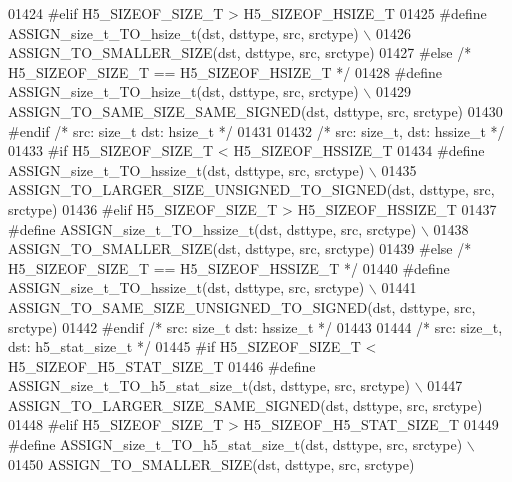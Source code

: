 \begin{DoxyCode}
01424 \textcolor{preprocessor}{#elif H5\_SIZEOF\_SIZE\_T > H5\_SIZEOF\_HSIZE\_T}
01425 \textcolor{preprocessor}{    #define ASSIGN\_size\_t\_TO\_hsize\_t(dst, dsttype, src, srctype) \(\backslash\)}
01426 \textcolor{preprocessor}{        ASSIGN\_TO\_SMALLER\_SIZE(dst, dsttype, src, srctype)}
01427 \textcolor{preprocessor}{#else }\textcolor{comment}{/* H5\_SIZEOF\_SIZE\_T == H5\_SIZEOF\_HSIZE\_T */}\textcolor{preprocessor}{}
01428 \textcolor{preprocessor}{    #define ASSIGN\_size\_t\_TO\_hsize\_t(dst, dsttype, src, srctype) \(\backslash\)}
01429 \textcolor{preprocessor}{        ASSIGN\_TO\_SAME\_SIZE\_SAME\_SIGNED(dst, dsttype, src, srctype)}
01430 \textcolor{preprocessor}{#endif }\textcolor{comment}{/* src: size\_t dst: hsize\_t */}\textcolor{preprocessor}{}
01431 
01432 \textcolor{comment}{/* src: size\_t, dst: hssize\_t */}
01433 \textcolor{preprocessor}{#if H5\_SIZEOF\_SIZE\_T < H5\_SIZEOF\_HSSIZE\_T}
01434 \textcolor{preprocessor}{    #define ASSIGN\_size\_t\_TO\_hssize\_t(dst, dsttype, src, srctype) \(\backslash\)}
01435 \textcolor{preprocessor}{        ASSIGN\_TO\_LARGER\_SIZE\_UNSIGNED\_TO\_SIGNED(dst, dsttype, src, srctype)}
01436 \textcolor{preprocessor}{#elif H5\_SIZEOF\_SIZE\_T > H5\_SIZEOF\_HSSIZE\_T}
01437 \textcolor{preprocessor}{    #define ASSIGN\_size\_t\_TO\_hssize\_t(dst, dsttype, src, srctype) \(\backslash\)}
01438 \textcolor{preprocessor}{        ASSIGN\_TO\_SMALLER\_SIZE(dst, dsttype, src, srctype)}
01439 \textcolor{preprocessor}{#else }\textcolor{comment}{/* H5\_SIZEOF\_SIZE\_T == H5\_SIZEOF\_HSSIZE\_T */}\textcolor{preprocessor}{}
01440 \textcolor{preprocessor}{    #define ASSIGN\_size\_t\_TO\_hssize\_t(dst, dsttype, src, srctype) \(\backslash\)}
01441 \textcolor{preprocessor}{        ASSIGN\_TO\_SAME\_SIZE\_UNSIGNED\_TO\_SIGNED(dst, dsttype, src, srctype)}
01442 \textcolor{preprocessor}{#endif }\textcolor{comment}{/* src: size\_t dst: hssize\_t */}\textcolor{preprocessor}{}
01443 
01444 \textcolor{comment}{/* src: size\_t, dst: h5\_stat\_size\_t */}
01445 \textcolor{preprocessor}{#if H5\_SIZEOF\_SIZE\_T < H5\_SIZEOF\_H5\_STAT\_SIZE\_T}
01446 \textcolor{preprocessor}{    #define ASSIGN\_size\_t\_TO\_h5\_stat\_size\_t(dst, dsttype, src, srctype) \(\backslash\)}
01447 \textcolor{preprocessor}{        ASSIGN\_TO\_LARGER\_SIZE\_SAME\_SIGNED(dst, dsttype, src, srctype)}
01448 \textcolor{preprocessor}{#elif H5\_SIZEOF\_SIZE\_T > H5\_SIZEOF\_H5\_STAT\_SIZE\_T}
01449 \textcolor{preprocessor}{    #define ASSIGN\_size\_t\_TO\_h5\_stat\_size\_t(dst, dsttype, src, srctype) \(\backslash\)}
01450 \textcolor{preprocessor}{        ASSIGN\_TO\_SMALLER\_SIZE(dst, dsttype, src, srctype)}

\end{DoxyCode}
